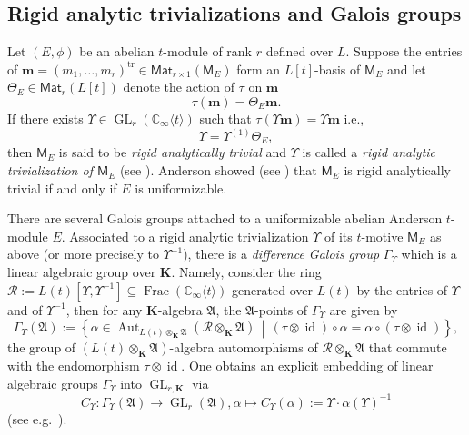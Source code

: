 \documentclass[10pt,a4paper]{amsart}
\theoremstyle{plain} %
\theoremstyle{definition}
\theoremstyle{remark}
\newcommand{\CC}{\mathbb{C}}
\newcommand{\cR}{\mathcal{R}}
\newcommand{\sfA}{\mathfrak{A}}
\newcommand{\bK}{\mathbf{K}}
\newcommand{\bsm}{\boldsymbol{m}}
\newcommand{\tr}{\operatorname{tr}}
\newcommand{\Aut}{\operatorname{Aut}}
\newcommand{\id}{\operatorname{id}}
\newcommand{\Mat}{\mathsf{Mat}}
\newcommand{\GL}{\operatorname{GL}}
\newcommand{\KI}{\mathbb{K}_{\infty}}  %
\newcommand{\CI}{\CC_{\infty}}  %
\newcommand{\cs}[1]{\langle #1 \rangle} %
\newcommand{\mot}{\mathsf{M}}  %
\numberwithin{equation}{subsection}
\begin{document}
\subsection{Rigid analytic trivializations and Galois groups}
\label{Sub:RATsAndGaloisGroups}

Let $(E, \phi)$ be an abelian $t$-module of rank $r$ defined over $L$. Suppose the entries of $\bsm = (m_1, \dots, m_r)^{\tr} \in \Mat_{r\times 1}(\mot_E)$ form an $L[t]$-basis of $\mot_E$ and let $\Theta_E  \in \Mat_r(L[t])$ denote the action of $\tau$ on $\bsm$
\[
\tau(\bsm) = \Theta_E \bsm.
\]
If there exists $\Upsilon \in \GL_r(\CI\cs{t})$ such that $\tau (\Upsilon \bsm)= \Upsilon \bsm$ i.e., 
\begin{equation}\label{eq:difference-equation-for-Upsilon}
\Upsilon = \Upsilon^{(1)}\Theta_E,
\end{equation}
then $\mot_E$ is said to be \emph{rigid analytically trivial} and $\Upsilon$ is called a \emph{rigid analytic trivialization of $\mot_E$} (see \cite{ga:tm}). Anderson  showed (see \cite[Theorem 4]{ga:tm}) that $\mot_E$ is rigid analytically trivial if and only if $E$ is uniformizable.




There are several Galois groups attached to a uniformizable abelian Anderson $t$-module $E$. Associated to a rigid analytic trivialization $\Upsilon$ of its $t$-motive $\mot_E$ as above (or more precisely to $\Upsilon^{-1}$), there is a \emph{difference Galois group} $\Gamma_\Upsilon$ which is a linear algebraic group over $\bK$. Namely, consider the ring $\cR:=L(t)[\Upsilon,\Upsilon^{-1}]\subseteq \operatorname{Frac}(\CI\cs{t})$ generated over $L(t)$ by the entries of $\Upsilon$ and of $\Upsilon^{-1}$, then for any $\bK$-algebra $\sfA$, the $\sfA$-points of $\Gamma_\Upsilon$ are given by
\[  \Gamma_\Upsilon(\sfA) := \left\{ \alpha\in \Aut_{L(t)\otimes_{\bK}\sfA}(\cR\otimes_{\bK} \sfA) \,\middle|\, (\tau\otimes \id)\circ \alpha = \alpha\circ (\tau\otimes \id) \right\},\]
the group of $(L(t)\otimes_{\bK}\sfA)$-algebra automorphisms of $\cR\otimes_{\bK} \sfA$ that commute with the endomorphism $\tau\otimes \id$. One obtains an explicit embedding of linear algebraic groups $\Gamma_\Upsilon$ into $\GL_{r,\bK}$ via
\begin{equation}\label{eq:embedding-of-Gamma_Upsilon}
      C_\Upsilon: \Gamma_\Upsilon(\sfA)\to \GL_r(\sfA), \alpha \mapsto C_\Upsilon(\alpha):=\Upsilon\cdot \alpha(\Upsilon)^{-1}      
\end{equation} 
(see e.g.~\cite[Appendix A]{qg-am:ctmcrzvp}).
\end{document}
